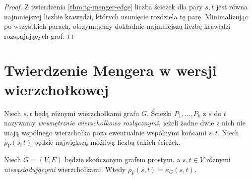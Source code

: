 \begin{proof}
Z twierdzenia \ref{thm:tg-menger-edge} liczba ścieżek
dla pary $s,t$ jest równa najmniejszej liczbie krawędzi,
których usunięcie rozdziela tę parę. Minimalizując po
wszystkich parach, otrzymujemy dokładnie najmniejszą
liczbę krawędzi rozspajających graf.
\end{proof}

\section{Twierdzenie Mengera w wersji wierzchołkowej}
\label{sec:tg-menger-vertices}

\begin{definicja}
Niech $s,t$ będą różnymi wierzchołkami grafu $G$.
Ścieżki $P_1,\dots,P_k$ z $s$ do $t$ nazywamy
\emph{wewnętrznie wierzchołkowo rozłącznymi}, jeżeli
żadne dwie z nich nie mają wspólnego wierzchołka
poza ewentualnie wspólnymi końcami $s,t$.
Niech $\rho_V(s,t)$ będzie największą możliwą
liczbą takich ścieżek.
\end{definicja}

\begin{twierdzenie}
\label{thm:tg-menger-vertex}
Niech $G=(V,E)$ będzie skończonym grafem prostym,
a $s,t\in V$ różnymi \emph{niesąsiadującymi} wierzchołkami.
Wtedy $\rho_V(s,t)=\kappa_G(s,t)$.
\end{twierdzenie}

